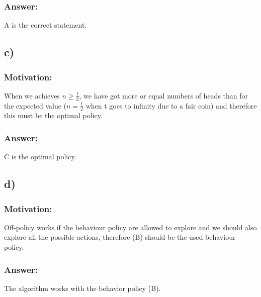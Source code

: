 \documentclass{article}
\begin{document}
\subsubsection*{Answer:}
A is the correct statement.

\subsection*{c)}
\subsubsection*{Motivation:}
When we achieves $n\geq \frac{t}{2}$, we have got more or equal numbers of heads than for the expected value ($ n = \frac{t}{2}$ when t goes to infinity due to a fair coin) and therefore this must be the optimal policy. 

\subsubsection*{Answer:}
C is the optimal policy.

\subsection*{d)}
\subsubsection*{Motivation:}
Off-policy works if the behaviour policy are allowed to explore and we should also explore all the possible actions, therefore (B) should be the used behaviour policy. 


\subsubsection*{Answer:}
The algorithm works with the behavior policy (B). 
\end{document}
